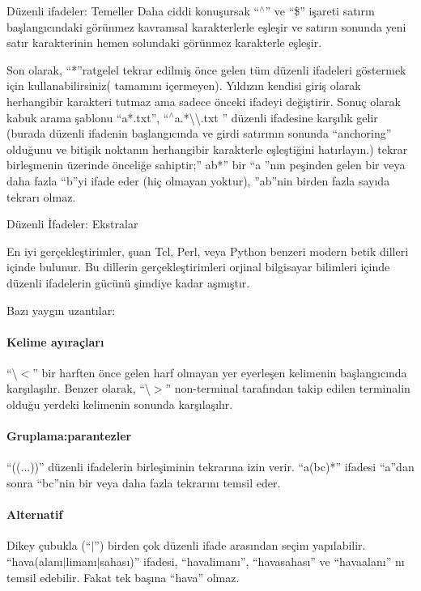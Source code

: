\begin{section}{Düzenli ifadeler: Temeller}
Daha ciddi konuşursak “$ ^\wedge $” ve “\$” işareti satırın başlangıcındaki görünmez kavramsal karakterlerle eşleşir ve satırın sonunda yeni satır karakterinin hemen solundaki görünmez karakterle eşleşir. 

Son olarak, “*”ratgelel tekrar edilmiş önce gelen tüm düzenli ifadeleri göstermek için kullanabilirsiniz( tamamını içermeyen). Yıldızın kendisi giriş olarak herhangibir karakteri tutmaz ama sadece önceki ifadeyi değiştirir. Sonuç olarak kabuk arama şablonu “a*.txt”, “$ ^\wedge $a.*\textbackslash \textbackslash.txt ” düzenli ifadesine karşılık gelir (burada düzenli ifadenin başlangıcında ve girdi satırının sonunda “anchoring” olduğunu ve bitişik noktanın herhangibir karakterle eşleştiğini hatırlayın.) tekrar birleşmenin üzerinde önceliğe sahiptir;” ab*” bir “a ”nın peşinden gelen bir veya daha fazla “b”yi ifade eder (hiç olmayan yoktur), ”ab”nin birden fazla sayıda tekrarı olmaz.

\begin{subsection}{Düzenli İfadeler: Ekstralar}

En iyi gerçekleştirimler, şuan Tcl, Perl, veya Python benzeri modern betik dilleri içinde bulunur. Bu dillerin gerçekleştirimleri orjinal bilgisayar bilimleri içinde düzenli ifadelerin gücünü şimdiye kadar aşmıştır. 

Bazı yaygın uzantılar:

\paragraph{Kelime ayıraçları}{ “\textbackslash $<$” bir harften önce gelen harf olmayan yer eyerleşen kelimenin başlangıcında karşılaşılır. Benzer olarak, “\textbackslash$>$”  non-terminal tarafından takip edilen terminalin olduğu yerdeki kelimenin sonunda karşılaşılır.}
\paragraph{Gruplama:parantezler}{ “((...))” düzenli ifadelerin birleşiminin tekrarına izin verir. “a(bc)*” ifadesi “a”dan sonra “bc”nin bir veya daha fazla tekrarını temsil eder.}
\paragraph{Alternatif} {Dikey çubukla (“$\vert$”) birden çok düzenli ifade arasından seçim yapılabilir. “hava(alanı$\vert$limanı$\vert$sahası)” ifadesi, “havalimanı”, “havasahası” ve “havaalanı” nı temsil edebilir. Fakat tek başına “hava” olmaz.}

\end{subsection}
\end{section}

